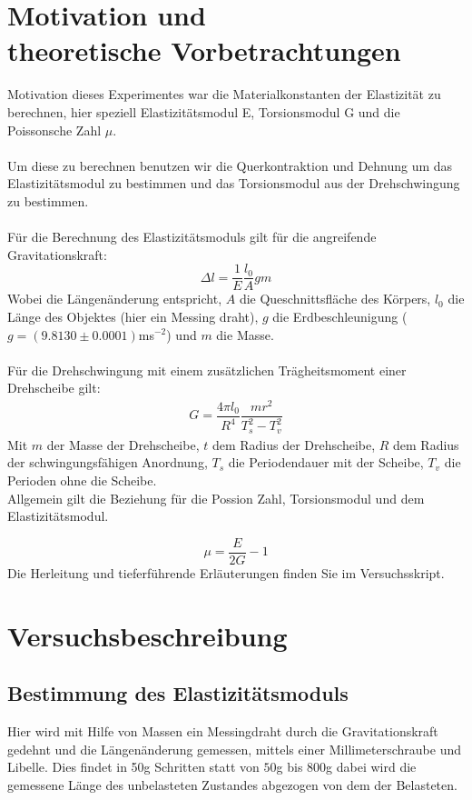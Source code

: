 \documentclass[bibliography=totocnumbered]{scrartcl}
\begin{document}
	
	\section{Motivation und \\theoretische Vorbetrachtungen}
	Motivation dieses Experimentes war die Materialkonstanten der Elastizität zu berechnen, hier speziell Elastizitätsmodul E, Torsionsmodul G und die Poissonsche Zahl $ \mu $.\\\\
	Um diese zu berechnen benutzen wir die Querkontraktion und Dehnung um das Elastizitätsmodul zu bestimmen und das Torsionsmodul aus der Drehschwingung zu bestimmen.\\\\
	Für die Berechnung des Elastizitätsmoduls gilt für die angreifende Gravitationskraft:
\begin{equation}\label{eq: Delta l}
	\Delta l=\dfrac{1}{E}\dfrac{l_{0}}{A}gm
\end{equation}
Wobei die Längenänderung entspricht, $ A $ die Queschnittsfläche des Körpers, $ l_{0} $ die Länge des Objektes (hier ein Messing draht), $ g $ die Erdbeschleunigung ($ g=(9.8130\pm 0.0001 )$ms$ ^{-2} $\smartcite{Muller.b}) und $ m $ die Masse.\\\\
Für die Drehschwingung mit einem zusätzlichen Trägheitsmoment einer Drehscheibe gilt:
	\begin{align}\label{eq: Torsionsmodul}
		G=\dfrac{4\pi l_{0}}{R^{4}}\dfrac{mr^{2}}{T_{s}^{2}-T_{v}^{2}}
	\end{align}
	Mit $ m $ der Masse der Drehscheibe, $ t $ dem Radius der Drehscheibe, $ R $ dem Radius der schwingungsfähigen Anordnung, $ T_{s} $ die Periodendauer mit der Scheibe, $ T_{v} $ die Perioden ohne die Scheibe.\\
	Allgemein gilt die Beziehung für die Possion Zahl, Torsionsmodul und dem Elastizitätsmodul.
	
	\begin{equation}\label{eq: Poisson Zahl}
		\mu= \dfrac{E}{2G}-1
	\end{equation}
Die Herleitung und tieferführende Erläuterungen finden Sie im Versuchsskript\smartcite{Muller.e}.
	
	\section{Versuchsbeschreibung}
	\subsection{Bestimmung des Elastizitätsmoduls}
	Hier wird mit Hilfe von Massen ein Messingdraht durch die Gravitationskraft gedehnt und die Längenänderung gemessen, mittels einer Millimeterschraube und Libelle. Dies findet in 50g Schritten statt von $ 50 $g bis $ 800 $g dabei wird die gemessene Länge des unbelasteten Zustandes abgezogen von dem der Belasteten.
	
\end{document}
